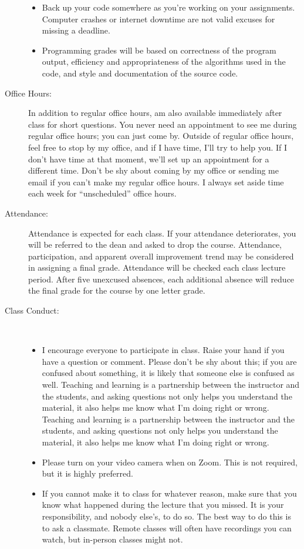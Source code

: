 \documentclass [letterpaper,11pt]{article}
\begin{document}
\begin{description}
\begin{itemize}
         \item Back up your code somewhere as you're working on your assignments.  Computer
                crashes or internet downtime are not valid excuses for missing a deadline.
                                

\item Programming grades will be based on correctness of the program output, efficiency and appropriateness of the algorithms used in the code, and style and documentation of the source code.
\end{itemize}

\item[Office Hours:]
In addition to regular office hours, am also available immediately after class for
short questions. You never need an appointment to see me during regular office hours; you
can just come by. Outside of regular office hours, feel free to stop by my office, and if I have
time, I'll try to help you. If I don't have time at that moment, we'll set up an appointment
for a different time. Don't be shy about coming by my office or sending me email if you can't
make my regular office hours. I always set aside time each week for ``unscheduled'' office
hours.

\item[Attendance:]
Attendance is expected for each class. If your attendance deteriorates, you will be referred to the dean and asked to drop the course. Attendance, participation, and apparent overall improvement trend may be considered in assigning a final grade.
Attendance will be checked each class lecture period.  After five unexcused absences, each additional absence will reduce the final grade for the course by one letter grade.

\item[Class Conduct:] \
   \begin{itemize}\setlength{\itemsep}{0em}\setlength{\parskip}{0pt}
   	\item I encourage everyone to participate in class. Raise your hand if you have a question or
comment. Please don't be shy about this; if you are confused about something, it is likely
that someone else is confused as well. Teaching and learning is a partnership between
the instructor and the students, and asking questions not only helps you understand the
material, it also helps me know what I'm doing right or wrong.
		Teaching and learning is a partnership between the instructor and the students, and asking questions not only helps you understand the material, it also
		helps me know what I'm doing right or wrong.
	\item Please turn on your video camera when on Zoom.  This is not required, but it is highly preferred.
	\item  If you cannot make it to class for whatever reason, make sure that you know what
happened during the lecture that you missed. It is your responsibility, and nobody
else's, to do so. The best way to do this is to ask a classmate.  Remote classes will  often
have recordings you can watch, but in-person classes might not. 
	     

\end{itemize}
\end{description}
\end{document}
